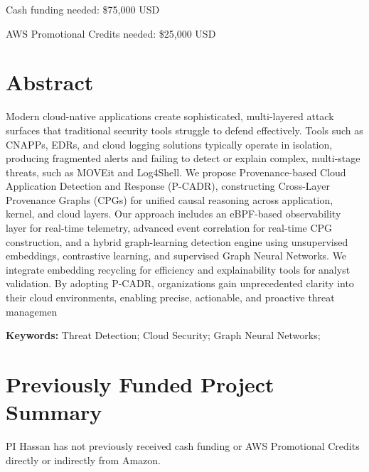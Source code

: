 \documentclass[11pt,pdftex]{article}
\begin{document}
\thispagestyle{firststyle}
\vspace{-3mm}

Cash funding needed: \$75,000 USD

AWS Promotional Credits needed: \$25,000 USD

  \section*{Abstract}
  Modern cloud-native applications create sophisticated, multi-layered attack surfaces that traditional security tools struggle to defend effectively. Tools such as CNAPPs, EDRs, and cloud logging solutions typically operate in isolation, producing fragmented alerts and failing to detect or explain complex, multi-stage threats, such as MOVEit and Log4Shell. We propose Provenance-based Cloud Application Detection and Response (P-CADR), constructing Cross-Layer Provenance Graphs (CPGs) for unified causal reasoning across application, kernel, and cloud layers. Our approach includes an eBPF-based observability layer for real-time telemetry, advanced event correlation for real-time CPG construction, and a hybrid graph-learning detection engine using unsupervised embeddings, contrastive learning, and supervised Graph Neural Networks. We integrate embedding recycling for efficiency and explainability tools for analyst validation. By adopting P-CADR, organizations gain unprecedented clarity into their cloud environments, enabling precise, actionable, and proactive threat managemen



\smallskip
{\bf Keywords:} Threat Detection; Cloud Security; Graph Neural Networks;


\thispagestyle{firststyle}
\setcounter{page}{1}


\pagestyle{plain}
\newpage

\setcounter{page}{1}
{\scriptsize
\printbibliography
}

\newpage


\setcounter{page}{1}
\newpage
\section*{Previously Funded Project Summary}
PI Hassan has not previously received cash funding or AWS Promotional Credits directly or indirectly from Amazon.
\end{document}
